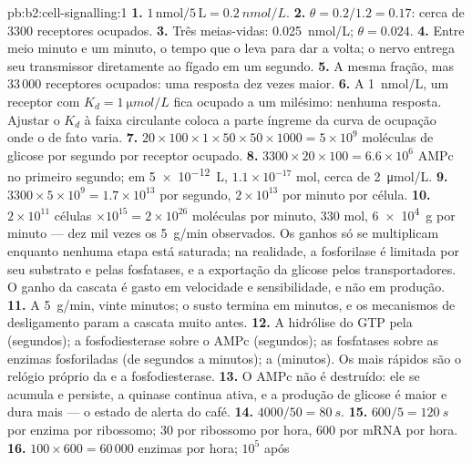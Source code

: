 \begin{solution}{pb:b2:cell-signalling:1}
\textbf{1.} $1\,\text{nmol}/5\,\text{L} = \qty{0.2}{nmol/L}$.
\textbf{2.} $\theta = 0.2/1.2 = 0.17$: cerca de 3300 receptores
ocupados.
\textbf{3.} Três meias-vidas: \qty{0.025}{nmol/L}; $\theta = 0.024$.
\textbf{4.} Entre meio minuto e um minuto, o tempo que o  leva
para dar a volta; o nervo entrega seu transmissor diretamente ao fígado
em um segundo.
\textbf{5.} A mesma fração, mas $33\,000$ receptores ocupados: uma
resposta dez vezes maior.
\textbf{6.} A \qty{1}{nmol/L}, um receptor com $K_d = \qty{1}{\micro
mol/L}$ fica ocupado a um milésimo: nenhuma resposta. Ajustar o $K_d$ à
faixa circulante coloca a parte íngreme da curva de ocupação onde o
 de fato varia.
\textbf{7.} $20\times 100\times 1\times 50\times 50\times 1000 =
5\times 10^{9}$ moléculas de glicose por segundo por receptor ocupado.
\textbf{8.} $3300\times 20\times 100 = 6.6\times 10^{6}$ AMPc no
primeiro segundo; em \qty{5e-12}{L}, $1.1\times 10^{-17}$ mol, cerca de
\qty{2}{\micro mol/L}.
\textbf{9.} $3300\times 5\times 10^{9} = 1.7\times 10^{13}$ por segundo, $2\times
10^{13}$ por minuto por célula.
\textbf{10.} $2\times 10^{11}$ células $\times 10^{15} = 2\times
10^{26}$ moléculas por minuto, 330 mol, \qty{6e4}{g} por minuto ---
dez mil vezes os \qty{5}{g/min} observados. Os ganhos só se multiplicam
enquanto nenhuma etapa está saturada; na realidade, a fosforilase é
limitada por seu substrato e pelas fosfatases, e a exportação da glicose
pelos transportadores. O ganho da cascata é gasto em velocidade e
sensibilidade, e não em produção.
\textbf{11.} A \qty{5}{g/min}, vinte minutos; o susto termina em
minutos, e os mecanismos de desligamento param a cascata muito antes.
\textbf{12.} A hidrólise do GTP pela  (segundos); a
fosfodiesterase sobre o AMPc (segundos); as fosfatases sobre as enzimas
fosforiladas (de segundos a minutos); a  (minutos). Os mais rápidos são o relógio próprio da  e a fosfodiesterase.
\textbf{13.} O AMPc não é destruído: ele se acumula e persiste, a
quinase continua ativa, e a produção de glicose é maior e dura mais ---
o estado de alerta do café.
\textbf{14.} $4000/50 = \qty{80}{s}$.
\textbf{15.} $600/5 = \qty{120}{s}$ por enzima por ribossomo; 30 por
ribossomo por hora, 600 por mRNA por hora.
\textbf{16.} $100\times 600 = 60\,000$ enzimas por hora; $10^{5}$ após

\end{solution}
